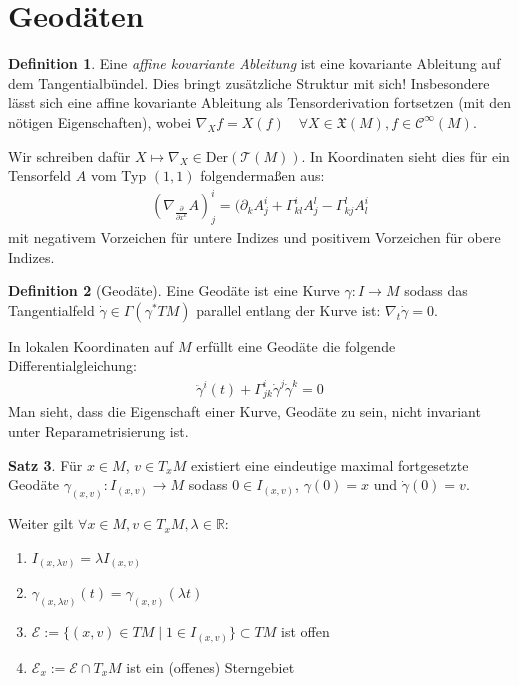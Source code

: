 \documentclass[a4paper]{scrbook}
\numberwithin{equation}{chapter}
\newcommand{\R}{\mathbb{R}}
\newcommand{\sC}{\mathcal{C}^{\infty}}
\newcommand{\vf}{\mathfrak{X}}
\theoremstyle{definition}
\newtheorem{defn}{Definition}[section]
\newtheorem{satz}[defn]{Satz}
\begin{document}
	\section{Geodäten}
		\begin{defn}
			Eine \emph{affine kovariante Ableitung} ist eine kovariante Ableitung auf dem Tangentialbündel. Dies bringt zusätzliche Struktur mit sich! Insbesondere lässt sich eine affine kovariante Ableitung als Tensorderivation fortsetzen (mit den nötigen Eigenschaften), wobei $\nabla_Xf=X(f) \quad\forall X\in\vf(M),f\in\sC(M)$.
			
			Wir schreiben dafür $X\mapsto\nabla_X\in \mathrm{Der}(\mathcal{T}(M))$. In Koordinaten sieht dies für ein Tensorfeld $A$ vom Typ $(1,1)$ folgendermaßen aus:
			\begin{align*}
				(\nabla_{\frac{\partial}{\partial x^k}} A)^i_j=(\partial_k A^i_j+\Gamma^i_{kl}A^l_j-\Gamma^l_{kj}A^i_l
			\end{align*}
			mit negativem Vorzeichen für untere Indizes und positivem Vorzeichen für obere Indizes.
		\end{defn}
		\begin{defn}[Geodäte]
			Eine Geodäte ist eine Kurve $\gamma\colon I\rightarrow M$ sodass das Tangentialfeld $\dot{\gamma}\in\Gamma(\gamma^*TM)$ parallel entlang der Kurve ist: $\nabla_{t}\dot{\gamma}=0$.
			
			In lokalen Koordinaten auf $M$ erfüllt eine Geodäte die folgende Differentialgleichung:
			\begin{align*}
				\ddot{\gamma}^i(t)+\Gamma^i_{jk}\dot{\gamma}^j\dot{\gamma}^k=0
			\end{align*}
			Man sieht, dass die Eigenschaft einer Kurve, Geodäte zu sein, nicht invariant unter Reparametrisierung ist.
		\end{defn}
		\begin{satz}
			Für $x\in M$, $v\in T_xM$ existiert eine eindeutige maximal fortgesetzte Geodäte $\gamma_{(x,v)}\colon I_{(x,v)}\rightarrow M$ sodass $0\in I_{(x,v)}$, $\gamma(0)=x$ und $\dot{\gamma}(0)=v$.
			
			Weiter gilt $\forall x\in M, v\in T_xM,\lambda\in \R$:
			\begin{enumerate}[label=(\alph*)]
				\item $I_{(x,\lambda v)}=\lambda I_{(x,v)}$
				\item $\gamma_{(x,\lambda v)}(t)=\gamma_{(x, v)}(\lambda t)$
				\item $\mathcal{E}:=\lbrace (x,v)\in TM\mid 1\in I_{(x,v)}\rbrace\subset TM$ ist offen
				\item $\mathcal{E}_x:=\mathcal{E}\cap T_xM$ ist ein (offenes) Sterngebiet
			\end{enumerate}		 
		\end{satz}
\end{document}
